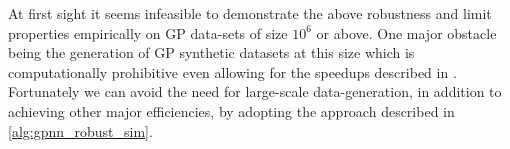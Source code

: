 At first sight it seems infeasible to demonstrate the above robustness and limit properties empirically on GP data-sets of size $10^6$ or above. One major obstacle being the generation of GP synthetic datasets at this size which is computationally prohibitive even allowing for the speedups described in \cite{synth_data2022}. Fortunately we can avoid the need for large-scale data-generation, in addition to achieving other major efficiencies, by adopting the approach described in \autoref{alg:gpnn_robust_sim}.

